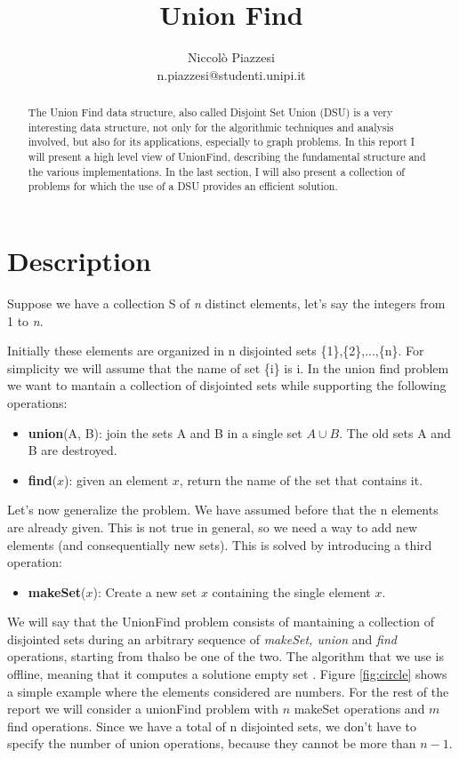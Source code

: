 \documentclass{article}
\begin{document}
\title{ \textbf{Union Find}}
\author{Niccolò Piazzesi\\n.piazzesi@studenti.unipi.it}
\maketitle
\begin{abstract}
The Union Find data structure, also called Disjoint Set Union (DSU) is a very interesting data structure, not 
only  for the algorithmic techniques and  analysis involved, but also for its applications, especially to graph problems. In this
report I will present a high level view of UnionFind, describing the fundamental structure and the various implementations. In the last section, I will also present
a collection of problems for which the use of a DSU provides an efficient solution.
\end{abstract}
\section{Description}
Suppose we have a collection S of \emph{n} distinct elements, let's say the integers from 1 to \emph{n}. 

Initially these elements
are organized in n disjointed sets \{1\},\{2\},...,\{n\}. For simplicity we will assume that the name of set \{i\}
is i. In the union find problem we want to mantain a collection of disjointed sets while supporting the following operations:
\begin{itemize}
    \item \textbf{union}(A, B): join the sets A and B in a single set $A \cup B$. The old sets A and B are destroyed.
    \item \textbf{find}($x$): given an element $x$, return the name of the set that contains it.
\end{itemize}
Let's now generalize the problem. We have assumed before that the n elements are already given. This is not true in general, so we need a way to 
add new elements (and consequentially new sets). This is solved by introducing a third operation:
\begin{itemize}
    \item \textbf{makeSet}($x$): Create a new set {$x$} containing the single element $x$.
\end{itemize}
    We will say that the UnionFind problem consists of mantaining a collection of disjointed sets during 
an arbitrary sequence of \emph{makeSet, union} and \emph{find} operations, starting from thalso be one of the two.
The algorithm that we use is offline, meaning that it computes a solutione empty set \cite{demetrescu}. Figure \ref{fig:circle} shows a
simple example where the elements considered are numbers. For the rest of the report we will consider a unionFind problem with
$n$ makeSet operations and $m$ find operations. Since we have a total of n disjointed sets, we don't have to specify the number
of union operations, because they cannot be more than $n-1$.
\end{document}
